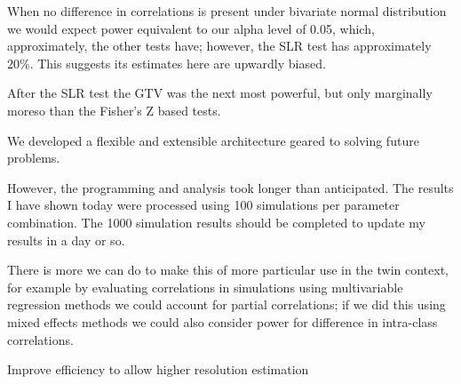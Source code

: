 When no difference in correlations is present under bivariate normal distribution we would expect power equivalent to our alpha level of 0.05, which, approximately, the other tests have; however, the SLR test has approximately 20\%.  This suggests its estimates here are upwardly biased.

After the SLR test the GTV was the next most powerful, but only marginally moreso than the Fisher's Z based tests.



We developed a flexible and extensible architecture geared to solving future problems.


However, the programming and analysis took longer than anticipated.  The results I have shown today were processed using 100 simulations per parameter combination.  The 1000 simulation results should be completed to update my results in a day or so.

There is more we can do to make this of more particular use in the twin context, for example by evaluating correlations in simulations using multivariable regression methods we could account for partial correlations; if we did this using mixed effects methods we could also consider power for difference in intra-class correlations.

Improve efficiency to allow higher resolution estimation
